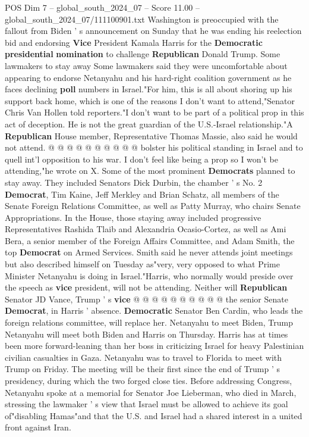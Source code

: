 \begin{textsample}{POS Dim 7 – global\_south\_2024\_07 – Score 11.00 – global\_south\_2024\_07/111100901.txt}
Washington is preoccupied with the fallout from Biden ' s announcement on Sunday that he was ending his reelection bid and endorsing \textbf{Vice} President Kamala Harris for the \textbf{Democratic} \textbf{presidential} \textbf{nomination} to challenge \textbf{Republican} Donald Trump.
Some lawmakers to stay away Some lawmakers said they were uncomfortable about appearing to endorse Netanyahu and his hard-right coalition government as he faces declining \textbf{poll} numbers in Israel."For him, this is all about shoring up his support back home, which is one of the reasons I don't want to attend,"Senator Chris Van Hollen told reporters."I don't want to be part of a political prop in this act of deception.
He is not the great guardian of the U.S.-Israel relationship."A \textbf{Republican} House member, Representative Thomas Massie, also said he would not attend. @ @ @ @ @ @ @ @ @ @ bolster his political standing in Israel and to quell int'l opposition to his war.
I don't feel like being a prop so I won't be attending,"he wrote on X.
Some of the most prominent \textbf{Democrats} planned to stay away.
They included Senators Dick Durbin, the chamber ' s No. 2 \textbf{Democrat}, Tim Kaine, Jeff Merkley and Brian Schatz, all members of the Senate Foreign Relations Committee, as well as Patty Murray, who chairs Senate Appropriations.
In the House, those staying away included progressive Representatives Rashida Tlaib and Alexandria Ocasio-Cortez, as well as Ami Bera, a senior member of the Foreign Affairs Committee, and Adam Smith, the top \textbf{Democrat} on Armed Services.
Smith said he never attends joint meetings but also described himself on Tuesday as"very, very opposed to what Prime Minister Netanyahu is doing in Israel."Harris, who normally would preside over the speech as \textbf{vice} president, will not be attending.
Neither will \textbf{Republican} Senator JD Vance, Trump ' s \textbf{vice} @ @ @ @ @ @ @ @ @ @ the senior Senate \textbf{Democrat}, in Harris ' absence. \textbf{Democratic} Senator Ben Cardin, who leads the foreign relations committee, will replace her.
Netanyahu to meet Biden, Trump Netanyahu will meet both Biden and Harris on Thursday.
Harris has at times been more forward-leaning than her boss in criticizing Israel for heavy Palestinian civilian casualties in Gaza.
Netanyahu was to travel to Florida to meet with Trump on Friday.
The meeting will be their first since the end of Trump ' s presidency, during which the two forged close ties.
Before addressing Congress, Netanyahu spoke at a memorial for Senator Joe Lieberman, who died in March, stressing the lawmaker ' s view that Israel must be allowed to achieve its goal of"disabling Hamas"and that the U.S. and Israel had a shared interest in a united front against Iran.

\end{textsample}
